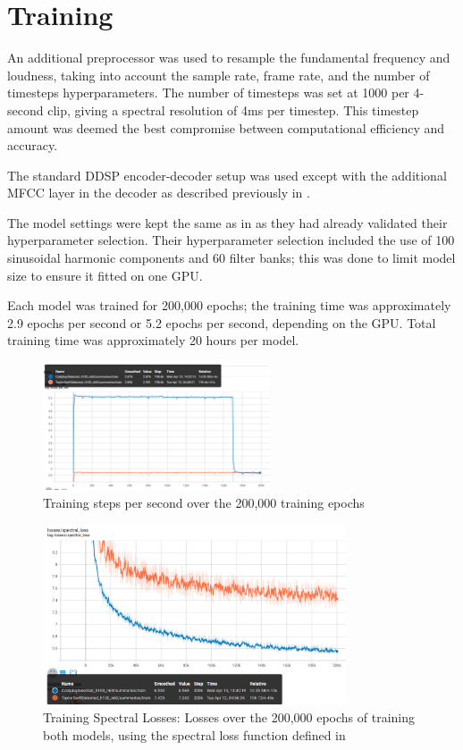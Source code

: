 \section{Training}

An additional preprocessor was used to resample the fundamental frequency and loudness, taking into account the sample rate, frame rate, and the number of timesteps hyperparameters. The number of timesteps was set at 1000 per 4-second clip, giving a spectral resolution of 4ms per timestep. This timestep amount was deemed the best compromise between computational efficiency and accuracy.

The standard DDSP encoder-decoder setup was used except with the additional MFCC layer in the decoder as described previously in .

The model settings were kept the same as in  as they had already validated their hyperparameter selection. Their hyperparameter selection included the use of 100 sinusoidal harmonic components and 60 filter banks; this was done to limit model size to ensure it fitted on one GPU.

Each model was trained for 200,000 epochs; the training time was approximately 2.9 epochs per second or 5.2 epochs per second, depending on the GPU. Total training time was approximately 20 hours per model.

\begin{figure}[!ht]
    \centering
    \includegraphics[width=0.6\textwidth]{research/training/StepsPerSecond.png}
    \caption{Training steps per second over the 200,000 training epochs}
\end{figure}

\begin{figure}[!ht]
    \centering
    \includegraphics[width=0.8\textwidth]{research/training/TrainingSpectralLosses.png}
    \caption{Training Spectral Losses: Losses over the 200,000 epochs of training both models, using the spectral loss function defined in }
    \label{fig:training_spectral_losses}
\end{figure}

